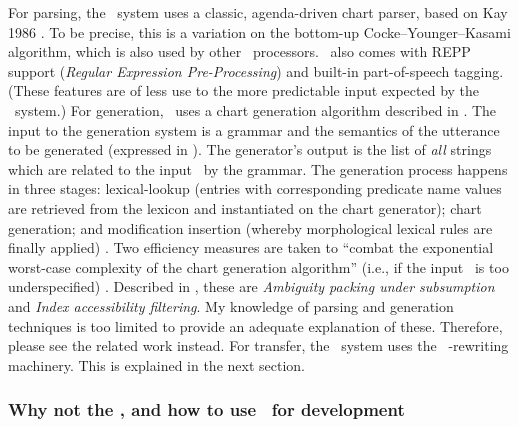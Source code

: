 For parsing, the \ace\ system uses a classic, agenda-driven chart parser, based
on Kay 1986 \citep{crysmann2012towards}. To be precise, this is a variation on
the bottom-up Cocke–Younger–Kasami algorithm, which is also used by other
\delphin\ processors. \ace\ also comes with REPP support (\emph{Regular
Expression Pre-Processing}) and built-in part-of-speech tagging. (These
features are of less use to the more predictable input expected by the
\depicto\ system.) For generation, \ace\ uses a chart generation algorithm
described in \citet{carroll1999efficient}. The input to the generation system
is a grammar and the semantics of the utterance to be generated (expressed in
\mrs). The generator's output is the list of \emph{all} strings which are
related to the input \mrs\ by the grammar. The generation process happens in
three stages: lexical-lookup (entries with corresponding predicate name values
are retrieved from the lexicon and instantiated on the chart generator); chart
generation; and modification insertion (whereby morphological lexical rules are
finally applied) \citep{fokkens2014enhancing}. Two efficiency measures are
taken to ``combat the exponential worst-case complexity of the chart generation
algorithm'' (i.e., if the input \mrs\ is too underspecified)
\citep{crysmann2012towards}. Described in \citet{carroll2005high}, these are
\emph{Ambiguity packing under subsumption} and \emph{Index accessibility
filtering}. My knowledge of parsing and generation techniques is too limited to
provide an adequate explanation of these. Therefore, please see the related
work instead. For transfer, the \ace\ system uses the \logon\ \mrs-rewriting
machinery. This is explained in the next section.

\subsubsection{Why not the \lkb, and how to use \ace\ for development}
\label{lkbvace}


